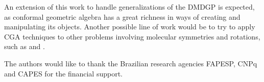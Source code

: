 \documentclass{proc}
\begin{document}
An extension of this work to handle generalizations of the DMDGP is expected, as conformal geometric algebra has a great richness in ways of creating and manipulating its objects.
Another possible line of work would be to try to apply CGA techniques to other problems involving molecular symmetries and rotations, such as \cite{Fritzer2001} and \cite{Karney2007}.



\begin{acknowledgments}
The authors would like to thank the Brazilian research agencies FAPESP, CNPq and CAPES for the financial support.
\end{acknowledgments}


  
\end{document}
